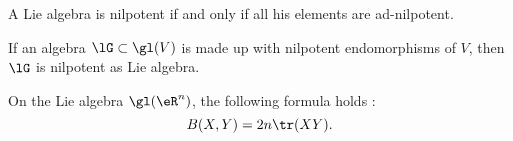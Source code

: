 \begin{theorem}\label{tho:Engel}
    A Lie algebra is nilpotent if and only if all his elements are ad-nilpotent.
\end{theorem}



\begin{proposition}\label{PropBDrongP}
    If an algebra $\lG\subset\gl(V)$ is made up with nilpotent endomorphisms of $V$, then $\lG$ is nilpotent as Lie algebra.
\end{proposition}

\begin{proposition} \label{PropKillingTraceDeuxn}
    On the Lie algebra \( \gl(\eR^n)\), the following formula holds :
    \begin{equation}
       B(X,Y)=2n\tr(XY).
    \end{equation}
\end{proposition}

